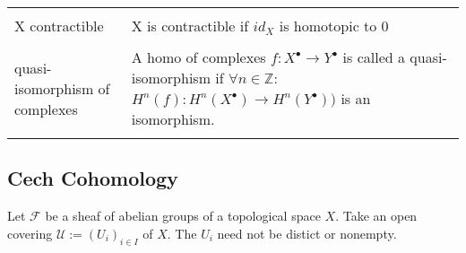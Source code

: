 \documentclass[a4paper, 12pt]{article}
\newcommand{\ca}[1]{\mathcal{#1}}
\newcommand{\caf}{\mathcal{F}}
\begin{document}
\begin{longtable}{p{}  p{} }
  &\\

  X contractible & X is contractible if $id_X$ is homotopic to 0\\

  &\\

  quasi-isomorphism of complexes & A homo of complexes $f:X^{\bullet} \longrightarrow Y^{\bullet}$ is called a quasi-isomorphism if $\forall n \in \mathbb{Z} :$ $H^n(f):H^n(X^{\bullet}) \xrightarrow{~} H^n(Y^{\bullet}))$ is an isomorphism.\\

  &\\

  
  
	
\end{longtable}

\subsection{Cech Cohomology}

Let $\caf$ be a sheaf of abelian groups of a topological space $X$. Take an open covering $\ca{U}:=(U_{i})_{i \in I}$  of $ X $. The $U_i$ need not be distict or nonempty.
\end{document}
